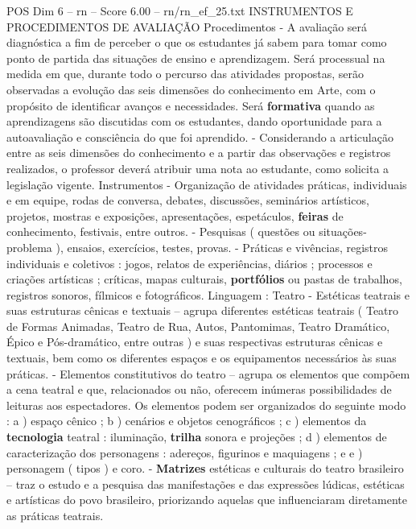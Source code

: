 \begin{textsample}{POS Dim 6 – rn – Score 6.00 – rn/rn\_ef\_25.txt}  \label{ex:f6_pos_240}
INSTRUMENTOS E PROCEDIMENTOS DE AVALIAÇÃO Procedimentos - A avaliação será diagnóstica a fim de perceber o que os estudantes já sabem para tomar como ponto de partida das situações de ensino e aprendizagem.
Será processual na medida em que, durante todo o percurso das atividades propostas, serão observadas a evolução das seis dimensões do conhecimento em Arte, com o propósito de identificar avanços e necessidades.
Será \textbf{formativa} quando as aprendizagens são discutidas com os estudantes, dando oportunidade para a autoavaliação e consciência do que foi aprendido. - Considerando a articulação entre as seis dimensões do conhecimento e a partir das observações e registros realizados, o professor deverá atribuir uma nota ao estudante, como solicita a legislação vigente.
Instrumentos - Organização de atividades práticas, individuais e em equipe, rodas de conversa, debates, discussões, seminários artísticos, projetos, mostras e exposições, apresentações, espetáculos, \textbf{feiras} de conhecimento, festivais, entre outros. - Pesquisas ( questões ou situações-problema ), ensaios, exercícios, testes, provas. - Práticas e vivências, registros individuais e coletivos : jogos, relatos de experiências, diários ; processos e criações artísticas ; críticas, mapas culturais, \textbf{portfólios} ou pastas de trabalhos, registros sonoros, fílmicos e fotográficos.
Linguagem : Teatro - Estéticas teatrais e suas estruturas cênicas e textuais – agrupa diferentes estéticas teatrais ( Teatro de Formas Animadas, Teatro de Rua, Autos, Pantomimas, Teatro Dramático, Épico e Pós-dramático, entre outras ) e suas respectivas estruturas cênicas e textuais, bem como os diferentes espaços e os equipamentos necessários às suas práticas. - Elementos constitutivos do teatro – agrupa os elementos que compõem a cena teatral e que, relacionados ou não, oferecem inúmeras possibilidades de leituras aos espectadores.
Os elementos podem ser organizados do seguinte modo : a ) espaço cênico ; b ) cenários e objetos cenográficos ; c ) elementos da \textbf{tecnologia} teatral : iluminação, \textbf{trilha} sonora e projeções ; d ) elementos de caracterização dos personagens : adereços, figurinos e maquiagens ; e e ) personagem ( tipos ) e coro. - \textbf{Matrizes} estéticas e culturais do teatro brasileiro – traz o estudo e a pesquisa das manifestações e das expressões lúdicas, estéticas e artísticas do povo brasileiro, priorizando aquelas que influenciaram diretamente as práticas teatrais.

\end{textsample}

